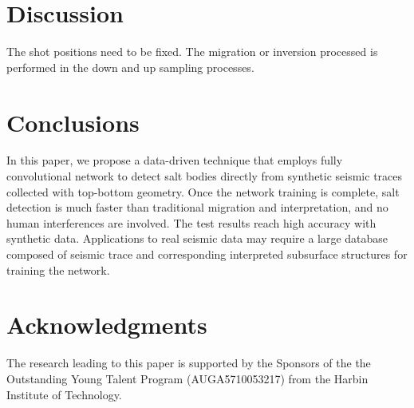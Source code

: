 \documentclass{segabs}
\begin{document}
\section{Discussion}
The shot positions need to be fixed.
The migration or inversion processed is performed in the down and up sampling processes. 


\section{Conclusions}
In this paper, we propose a data-driven technique that employs fully convolutional network to detect salt bodies directly from synthetic seismic traces collected with top-bottom geometry. Once the network training is complete, salt detection is much faster than traditional migration and interpretation, and no human interferences are involved. The test results reach high accuracy with synthetic data. Applications to real seismic data may require a large database composed of seismic trace and corresponding interpreted subsurface structures for training the network.


\section{Acknowledgments}

The research leading to this paper is supported by the Sponsors of the
the Outstanding Young Talent Program (AUGA5710053217) from the Harbin Institute of Technology. 

\newpage


\end{document}
